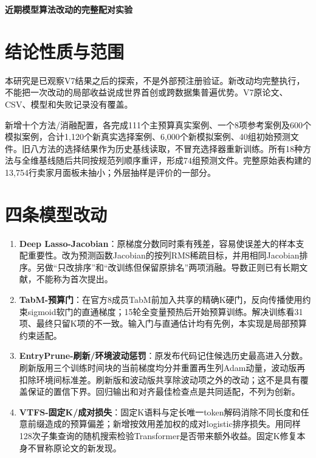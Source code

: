 \documentclass[UTF8,11pt,a4paper]{ctexart}
\providecommand{\tightlist}{\setlength{\itemsep}{0pt}\setlength{\parskip}{0pt}}
\begin{document}
\begin{center}\Large\bfseries 近期模型算法改动的完整配对实验\end{center}\section{结论性质与范围}\label{ux7ed3ux8bbaux6027ux8d28ux4e0eux8303ux56f4}

本研究是已观察V7结果之后的探索，不是外部预注册验证。新改动均完整执行，不能把一次改动的局部收益说成世界首创或跨数据集普遍优势。V7原论文、CSV、模型和失败记录没有覆盖。

新增十个方法/消融配置，各完成111个主预算真实案例、一个8项参考案例及600个模拟案例，合计1,120个新真实选择案例、6,000个新模拟案例、40组初始预测文件。旧八方法的选择结果作为历史基线读取，不冒充选择器重新训练。所有18种方法与全维基线随后共同按规范列顺序重评，形成74组预测文件。完整原始表构建的13,754行卖家月面板未抽小；外层抽样是评价的一部分。

\section{四条模型改动}\label{ux56dbux6761ux6a21ux578bux6539ux52a8}

\begin{enumerate}
\def\labelenumi{\arabic{enumi}.}
\tightlist
\item
  \textbf{Deep Lasso-Jacobian}：原梯度分数同时乘有残差，容易使误差大的样本支配重要性。改为预测函数Jacobian的按列RMS稀疏目标，并用相同Jacobian排序。另做``只改排序''和``改训练但保留原排名''两项消融。导数正则已有长期文献，不能称为首次提出。
\item
  \textbf{TabM-预算门}：在官方8成员TabM前加入共享的精确K硬门，反向传播使用约束sigmoid软门的直通梯度；15轮全变量预热后开始预算训练。解决训练看31项、最终只留K项的不一致。输入门与直通估计均有先例，本实现是局部预算约束适配。
\item
  \textbf{EntryPrune-刷新/环境波动惩罚}：原发布代码记住候选历史最高进入分数。刷新版用三个训练时间块的当前梯度均分并重置再生列Adam动量，波动版再扣除环境间标准差。刷新版和波动版共享除波动项之外的改动；这不是具有覆盖保证的置信下界。回归输出和对齐最佳检查点是共同适配，不列为创新。
\item
  \textbf{VTFS-固定K/成对损失}：固定K语料与定长唯一token解码消除不同长度和任意前缀造成的预算偏差；新增按效用差加权的成对logistic排序损失。用同样128次子集查询的随机搜索检验Transformer是否带来额外收益。固定K修复本身不冒称原论文的新发现。
\end{enumerate}
\end{document}
